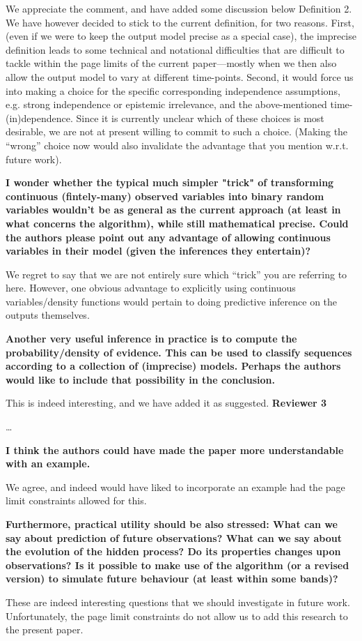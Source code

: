 \documentclass[twoside,11pt]{letter}
\begin{document}
We appreciate the comment, and have added some discussion below Definition 2. We have however decided to stick to the current definition, for two reasons. First, (even if we were to keep the output model precise as a special case), the imprecise definition leads to some technical and notational difficulties that are difficult to tackle within the page limits of the current paper---mostly when we then also allow the output model to vary at different time-points. Second, it would force us into making a choice for the specific corresponding independence assumptions, e.g. strong independence or epistemic irrelevance, and the above-mentioned time-(in)dependence. Since it is currently unclear which of these choices is most desirable, we are not at present willing to commit to such a choice. (Making the ``wrong'' choice now would also invalidate the advantage that you mention w.r.t. future work).

{\bf
I wonder whether the typical much simpler "trick" of transforming continuous (fintely-many) observed variables into binary random variables wouldn't be as general as the current approach (at least in what concerns the algorithm), while still mathematical precise. Could the authors please point out any advantage of allowing continuous variables in their model (given the inferences they entertain)? }

We regret to say that we are not entirely sure which ``trick'' you are referring to here. However, one obvious advantage to explicitly using continuous variables/density functions would pertain to doing predictive inference on the outputs themselves.

{\bf
Another very useful inference in practice is to compute the probability/density of evidence. This can be used to classify sequences according to a collection of (imprecise) models. Perhaps the authors would like to include that possibility in the conclusion. }

This is indeed interesting, and we have added it as suggested.
\newpage
{\bf Reviewer 3}

\ldots

{\bf
I think the authors could have made the paper more understandable with an example. }

We agree, and indeed would have liked to incorporate an example had the page limit constraints allowed for this.

{\bf
Furthermore, practical utility should be also stressed: What can we say about prediction of future observations? What can we say about the evolution of the hidden process? Do its properties changes upon observations? Is it possible to make use of the algorithm (or a revised version) to simulate future behaviour (at least within some bands)? }

These are indeed interesting questions that we should investigate in future work. Unfortunately, the page limit constraints do not allow us to add this research to the present paper.
\end{document}
